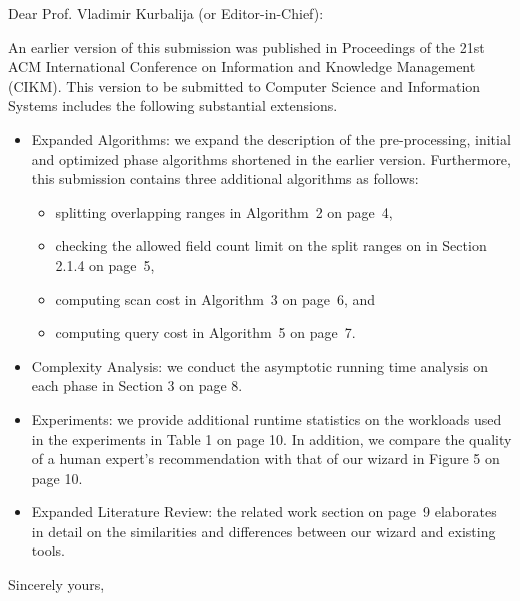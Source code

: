 \documentclass{letter} %
\begin{document}
\begin{letter}
\opening{Dear Prof. Vladimir Kurbalija (or Editor-in-Chief):} 
 
\noindent An earlier version of this submission was published in Proceedings of the 21st ACM \hbox{International} Conference on Information and Knowledge Management (CIKM). 
This version to be submitted to Computer Science and Information Systems includes the following substantial extensions.

\begin{itemize}

\item Expanded Algorithms: we expand the description of the pre-processing, initial and optimized phase algorithms shortened in the earlier version. Furthermore, this submission contains three additional algorithms as follows:

\begin{itemize}

\item splitting overlapping ranges in Algorithm~2 on page~4,
\item checking the allowed field count limit on the split ranges on in Section 2.1.4 on page~5,
\item computing scan cost in Algorithm~3 on page~6, and
\item computing query cost in Algorithm~5 on page~7.

\end{itemize} 
 
\item Complexity Analysis: we conduct the asymptotic running time analysis on each phase in Section 3 on page 8.

\item Experiments: we provide additional runtime statistics on the workloads used in the experiments in Table 1 on page 10. 
In addition, we compare the quality of a human expert's recommendation with that of our wizard in Figure 5 on page 10.

\item Expanded Literature Review: the related work section on page~9 elaborates in detail on the similarities and differences between our wizard and existing tools.

\end{itemize} 
 
\closing{Sincerely yours,} 

\end{letter}
 
\end{document}
